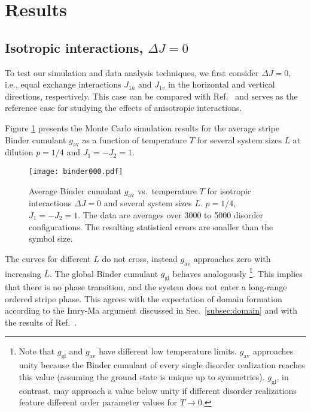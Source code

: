 \documentclass[twocolumn,showpacs,superscriptaddress,aps,prb]{revtex4-2}
\begin{document}
\section{Results}
\label{sec:results}
\subsection{Isotropic interactions, $\Delta J =0$}
\label{subsec:res_isotropic}

To test our simulation and data analysis techniques, we first consider $\Delta J = 0$, i.e.,
equal exchange interactions $J_{1h}$ and $J_{1v}$ in the horizontal and vertical directions,
respectively. This case can be compared with Ref.\ \cite{KunwarSenVojtaNarayanan18} and
serves as the reference case for studying the effects of anisotropic interactions.

Figure \ref{fig:00_gav} presents the Monte Carlo simulation results for the average stripe
Binder cumulant $g_\mathrm{av}$ as a function of temperature $T$ for several system sizes $L$
at dilution $p=1/4$ and  $J_1=-J_2=1$.
\begin{figure}
\texttt{[image: binder000.pdf]}
\caption{Average Binder cumulant $g_\mathrm{av}$ vs.\ temperature $T$ for isotropic
interactions $\Delta J=0$ and several system sizes $L$. $p=1/4$, $J_1=-J_2=1$.
The data are averages over 3000 to 5000 disorder configurations. The resulting statistical
errors are smaller than the symbol size.}
\label{fig:00_gav}
\end{figure}
The curves for different $L$ do not cross, instead $g_\mathrm{av}$ approaches zero with
increasing $L$. The global Binder cumulant $g_\mathrm{gl}$ behaves analogously
\footnote{Note that $g_\mathrm{gl}$ and $g_\mathrm{av}$ have different low temperature limits.
$g_\mathrm{av}$ approaches unity because the Binder cumulant of every single disorder realization
reaches this value (assuming the ground state is unique up to symmetries). $g_\mathrm{gl}$,
in contrast, may approach a value below unity if different disorder realizations feature different
order parameter values for $T \to 0$.}.
%
This implies that there is no phase transition, and the system does not enter
a long-range ordered stripe phase. This agrees with the expectation of domain formation
according to the Imry-Ma argument discussed in Sec.\
\ref{subsec:domain} and with the results of Ref.\ \cite{KunwarSenVojtaNarayanan18}.
\end{document}
